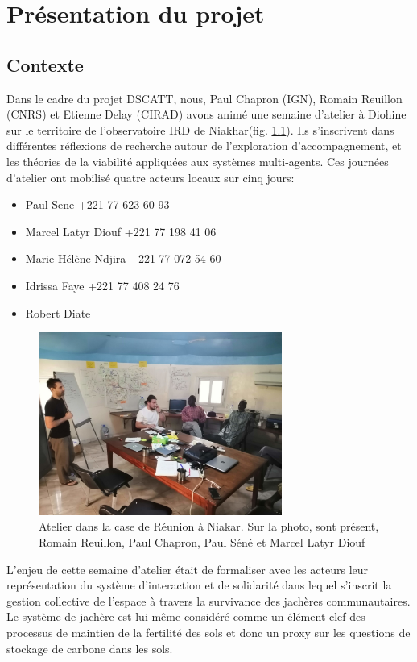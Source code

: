 \chapter{Présentation du projet}


\section{Contexte}

Dans le cadre du projet DSCATT, nous, Paul Chapron (IGN), Romain Reuillon (CNRS) et Etienne Delay (CIRAD) avons animé une semaine d'atelier à Diohine sur le territoire de l'observatoire IRD de Niakhar(fig. \ref{fig:photoAtelier}). Ils s'inscrivent dans différentes réflexions de recherche autour de l'exploration d'accompagnement, et les théories de la viabilité appliquées aux systèmes multi-agents.
Ces journées d'atelier ont mobilisé quatre acteurs locaux sur cinq jours:
\begin{itemize}
  \item Paul Sene +221 77 623 60 93
  \item Marcel Latyr Diouf +221 77 198 41 06
  \item Marie Hélène Ndjira +221 77 072 54 60
  \item Idrissa Faye +221 77 408 24 76
  \item Robert Diate
\end{itemize}


\begin{figure}
  \begin{center}
    \includegraphics[width=8cm]{img/atelier_niakhar.jpg}
  \end{center}
  \caption{Atelier dans la case de Réunion à Niakar. Sur la photo, sont présent, Romain Reuillon, Paul Chapron, Paul Séné et Marcel Latyr Diouf}
  \label{fig:photoAtelier}
\end{figure}


L'enjeu de cette semaine d'atelier était de formaliser avec les acteurs leur représentation du système d'interaction et de solidarité dans lequel s'inscrit la gestion collective de l'espace à travers la survivance des jachères communautaires. Le système de jachère est lui-même considéré comme un élément clef des processus de maintien de la fertilité des sols et donc un proxy sur les questions de stockage de carbone dans les sols.

